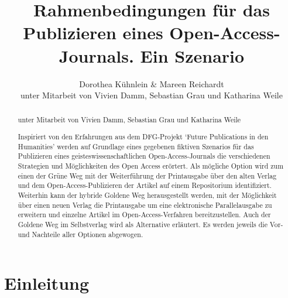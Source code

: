 \documentclass[a4paper,
fontsize=11pt,
oneside,
numbers=noperiodatend,
parskip=half-,
bibliography=totoc,
final
]{scrartcl}
\title{\LARGE{Rahmenbedingungen für das Publizieren eines Open-Access-Journals. Ein Szenario}}
\author{Dorothea Kühnlein \& Mareen Reichardt \\ \small{unter Mitarbeit von Vivien Damm, Sebastian Grau und Katharina Weile}} %
\date{}
\begin{document}
\maketitle
\thispagestyle{fancyplain} 

\begin{abstract}
unter Mitarbeit von Vivien Damm, Sebastian Grau und Katharina Weile

Inspiriert von den Erfahrungen aus dem DFG-Projekt `Future Publications
in den Humanities' werden auf Grundlage eines gegebenen fiktiven
Szenarios für das Publizieren eines geisteswissenschaftlichen
Open-Access-Journals die verschiedenen Strategien und Möglichkeiten des
Open Access erörtert. Als mögliche Option wird zum einen der Grüne Weg
mit der Weiterführung der Printausgabe über den alten Verlag und dem
Open-Access-Publizieren der Artikel auf einem Repositorium
identifiziert. Weiterhin kann der hybride Goldene Weg herausgestellt
werden, mit der Möglichkeit über einen neuen Verlag die Printausgabe um
eine elektronische Parallelausgabe zu erweitern und einzelne Artikel im
Open-Access-Verfahren bereitzustellen. Auch der Goldene Weg im
Selbstverlag wird als Alternative erläutert. Es werden jeweils die Vor-
und Nachteile aller Optionen abgewogen.
\end{abstract}

\section*{Einleitung}\label{einleitung}
\end{document}
